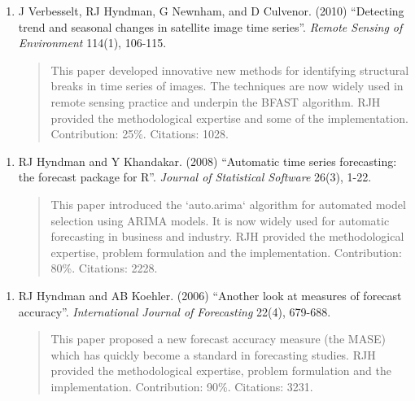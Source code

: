 \documentclass[10pt,a4paper,]{article}
\providecommand{\tightlist}{%
  \setlength{\itemsep}{0pt}\setlength{\parskip}{0pt}}
\begin{document}
\vspace*{0.2cm}

\begin{enumerate}
\def\labelenumi{\arabic{enumi}.}
\setcounter{enumi}{5}
\tightlist
\item
  J Verbesselt, RJ Hyndman, G Newnham, and D Culvenor. (2010) ``Detecting
  trend and seasonal changes in satellite image time series''. \emph{Remote
  Sensing of Environment} 114(1), 106-115.

  \begin{quote}     This paper developed innovative new methods for identifying structural breaks in time series of images. The techniques are now widely used in remote sensing practice and underpin the BFAST algorithm. RJH provided the methodological expertise and some of the implementation. Contribution: 25\%.  Citations: 1028.\end{quote}
\end{enumerate}

\vspace*{0.2cm}

\begin{enumerate}
\def\labelenumi{\arabic{enumi}.}
\setcounter{enumi}{6}
\tightlist
\item
  RJ Hyndman and Y Khandakar. (2008) ``Automatic time series forecasting:
  the forecast package for R''. \emph{Journal of Statistical Software} 26(3),
  1-22.

  \begin{quote}     This paper introduced the `auto.arima` algorithm for automated model selection using ARIMA models. It is now widely used for automatic forecasting in business and industry.  RJH provided the methodological expertise, problem formulation and the implementation. Contribution: 80\%.  Citations: 2228.\end{quote}
\end{enumerate}

\vspace*{0.2cm}

\begin{enumerate}
\def\labelenumi{\arabic{enumi}.}
\setcounter{enumi}{7}
\tightlist
\item
  RJ Hyndman and AB Koehler. (2006) ``Another look at measures of forecast
  accuracy''. \emph{International Journal of Forecasting} 22(4), 679-688.

  \begin{quote}     This paper proposed a new forecast accuracy measure (the MASE) which has quickly become a standard in forecasting studies. RJH provided the methodological expertise, problem formulation and the implementation. Contribution: 90\%.  Citations: 3231.\end{quote}
\end{enumerate}
\end{document}
